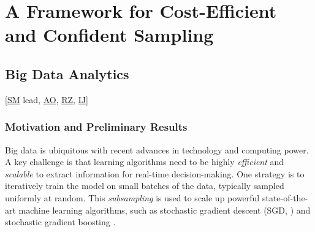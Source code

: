 \documentclass[11pt]{NSFamsart}
\newcommand{\cmtS}[1]{{\color{blue}{(Simon: #1)}}}
\newcommand{\SM}{\hyperlink{SMlink}{SM}\xspace}
\newcommand{\AO}{\hyperlink{AOlink}{AO}\xspace}
\newcommand{\IJi}{\hyperlink{IJlink}{IJ}\xspace}
\newcommand{\RZ}{\hyperlink{RZlink}{RZ}\xspace}
\begin{document}
\section{A Framework for Cost-Efficient and Confident Sampling}

\cmtS{Need to revise \& restructure given motivating scientific \& big data aims. But topics largely OK (with a bit of expansion)?
\begin{itemize}
\item Cost-efficient Bayesian inference
\item MLQMC / Multi-level experimental design
\item Cost-efficient big data analytics
\item Cost-efficient QMC? Fred: does this capture some of the proposed topics you had here, or do we need new ideas?

\item 1) Motivation, 2) Tasks, 3) Implementation and Application
\end{itemize}
}



\subsection{Big Data Analytics} [\SM lead, \AO, \RZ, \IJi{}] \label{sec:bigdata}

\subsubsection{Motivation and Preliminary Results} 
Big data is ubiquitous with recent advances in technology and computing power. A key challenge is that learning algorithms need to be highly \textit{efficient} and \textit{scalable} to extract information for real-time decision-making. One strategy is to iteratively train the model on small batches of the data, typically sampled uniformly at random. This \textit{subsampling} is used to scale up powerful state-of-the-art machine learning algorithms, such as stochastic gradient descent (SGD, \cite{Bot2010}) and stochastic gradient boosting \cite{friedman2002stochastic}.
\end{document}
